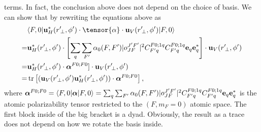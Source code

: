 \documentclass[preprint,aps,pra,onecolumn]{revtex4-1} %
\begin{document}
terms. In fact, the conclusion above does not depend on the choice of basis. We can show that by 
rewriting the equations above as
\begin{align}
&\bra{F,0} \mathbf{u}^*_H(r^\prime\!_\perp, \phi') \cdot \tensor{\alpha} \cdot 
	\mathbf{u}_{V}(r^\prime\!_\perp, \phi') \ket{F,0}\nonumber\\
=& \mathbf{u}^*_H(r^\prime\!_\perp, 
 \phi')\cdot \left[  \sum_{q} \sum_{F'}\alpha_0(F,F') 
   |o^{J'F'}_{JF} |^2 C^{F 	0;1q}_{F' q} C^{F 0;1q}_{F' q}
     	  \mathbf{e}_q \mathbf{e}^*_{q}  \right]\cdot \mathbf{u}_V(r^\prime\!_\perp, \phi') \\
=& \mathbf{u}^*_H(r^\prime\!_\perp,  \phi')\cdot \boldsymbol{\alpha}^{F0;F0}]\cdot 
\mathbf{u}_V(r^\prime\!_\perp, \phi') \\
=& \tr\left[ \left(  \mathbf{u}_V(r^\prime\!_\perp, \phi')  \mathbf{u}^*_H(r^\prime\!_\perp,  \phi')\right)
\cdot  \boldsymbol{\alpha}^{F0;F0} \right],
\end{align}
where $  \boldsymbol{\alpha}^{F0;F0} = \langle{F,0}\rvert\boldsymbol{\alpha}\lvert{F,0}\rangle = \sum_{q} 
\sum_{F'}\alpha_0(F,F') 
   |o^{J'F'}_{JF} |^2 C^{F 	0;1q}_{F' q} C^{F 0;1q}_{F' q}
     	  \mathbf{e}_q \mathbf{e}^*_{q} $ is the atomic 
polarizability tensor restricted to the $ (F,m_F=0) $ atomic space. The first block inside of the big bracket 
is a dyad. Obviously, the result as a trace does not depend on how we rotate the basis inside. 
 
\end{document}
